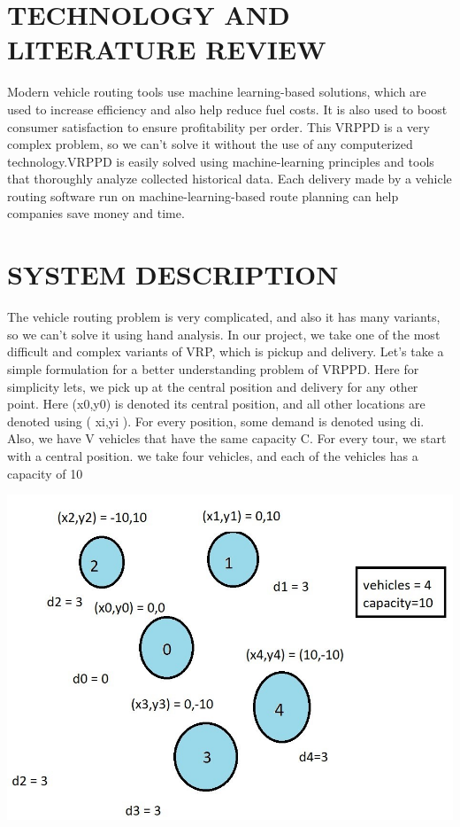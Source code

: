 \documentclass[conference]{IEEEtran}
\begin{document}
\section{{\textbf{TECHNOLOGY AND LITERATURE REVIEW}}}
Modern vehicle routing tools use machine learning-based solutions, which are used to increase efficiency and also help reduce fuel costs. It is also used to boost consumer satisfaction to ensure profitability per order. This VRPPD is a very complex problem, so we can't solve it without the use of any computerized technology.VRPPD is easily solved using machine-learning principles and tools that thoroughly analyze collected historical data. Each delivery made by a vehicle routing software run on machine-learning-based route planning can help companies save money and time.

\section{{\textbf{SYSTEM DESCRIPTION}}}
The vehicle routing problem is very complicated, and also it has many variants, so we can't solve it using hand analysis. In our project, we take one of the most difficult and complex variants of VRP, which is pickup and delivery. Let's take a simple formulation for a better understanding problem of VRPPD. Here for simplicity lets, we pick up at the central position and delivery for any other point. Here (x0,y0) is denoted its central position, and all other locations are denoted using ( xi,yi ). For every position, some demand is denoted using di. Also, we have V vehicles that have the same capacity C. For every tour, we start with a central position. we take four vehicles, and each of the vehicles has a capacity of 10


\includegraphics[width=1\linewidth]{
opti_1.jpg}\par  
\end{document}
